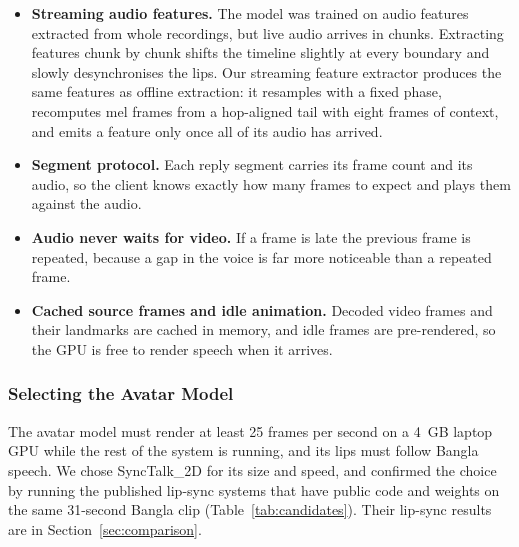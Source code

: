 \begin{itemize}
    \item \textbf{Streaming audio features.} The model was trained on audio features extracted from whole recordings, but live audio arrives in chunks. Extracting features chunk by chunk shifts the timeline slightly at every boundary and slowly desynchronises the lips. Our streaming feature extractor produces the same features as offline extraction: it resamples with a fixed phase, recomputes mel frames from a hop-aligned tail with eight frames of context, and emits a feature only once all of its audio has arrived.
    \item \textbf{Segment protocol.} Each reply segment carries its frame count and its audio, so the client knows exactly how many frames to expect and plays them against the audio.
    \item \textbf{Audio never waits for video.} If a frame is late the previous frame is repeated, because a gap in the voice is far more noticeable than a repeated frame.
    \item \textbf{Cached source frames and idle animation.} Decoded video frames and their landmarks are cached in memory, and idle frames are pre-rendered, so the GPU is free to render speech when it arrives.
\end{itemize}

\vspace{0.5em}

\subsubsection{Selecting the Avatar Model}
\label{sec:selection}

The avatar model must render at least 25 frames per second on a 4~GB laptop GPU while the rest of the system is running, and its lips must follow Bangla speech. We chose SyncTalk\_2D for its size and speed, and confirmed the choice by running the published lip-sync systems that have public code and weights on the same 31-second Bangla clip (Table~\ref{tab:candidates}). Their lip-sync results are in Section~\ref{sec:comparison}.

